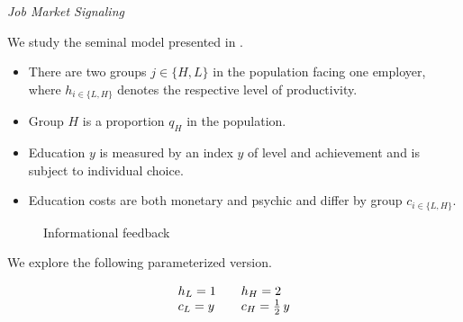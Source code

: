 \begin{frame}\begin{center}
		\LARGE\textit{Job Market Signaling}
\end{center}\end{frame}
\begin{frame}

We study the seminal model presented in .
\begin{itemize}\setlength\itemsep{1em}
\item There are two groups $j \in\{H, L\}$ in the population facing one employer, where  $h_{i\in\{L, H\}}$ denotes the respective level of productivity.
\item Group $H$ is a proportion $q_H$ in the population.
\item Education $y$ is measured by an index $y$ of level and achievement and is subject to individual choice.
\item Education costs are both monetary and psychic and differ by group $c_{i\in\{L, H\}}$.
\end{itemize}

\end{frame}
\begin{frame}\begin{figure}[htp]\centering
\caption{Informational feedback}
\end{figure}\end{frame}
\begin{frame}

We explore the following parameterized version.

\begin{align*}\begin{array}{l@{\qquad}l}
	h_L = 1   & h_H = 2 \\
	c_L = y   & c_H = \tfrac{1}{2}\,y \\
\end{array}\end{align*}

\end{frame}
